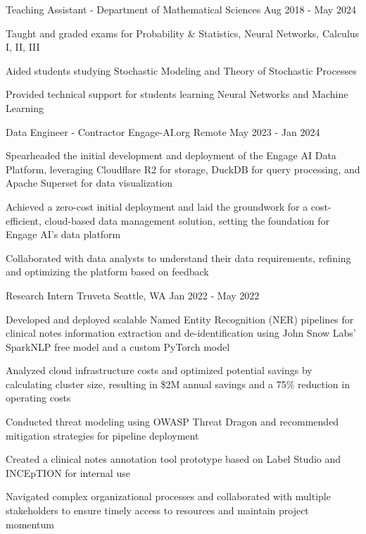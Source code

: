 \begin{cventries}
	\cventry
	{Teaching Assistant - Department of Mathematical Sciences}
	{}
	{}
	{Aug 2018 - May 2024}
	{\begin{cvitems}
			\item {Taught and graded exams for Probability \& Statistics, Neural Networks, Calculus I, II, III}
			\item {Aided students studying Stochastic Modeling and Theory of Stochastic Processes}
			\item {Provided technical support for students learning Neural Networks and Machine Learning}
		\end{cvitems}}
	
	
	\cventry
	{Data Engineer - Contractor}
	{Engage-AI.org}
	{Remote}
	{May 2023 - Jan 2024}
	{\begin{cvitems}
			\item {Spearheaded the initial development and deployment of the Engage AI Data Platform, leveraging Cloudflare R2 for storage, DuckDB for query processing, and Apache Superset for data visualization}
			\item {Achieved a zero-cost initial deployment and laid the groundwork for a cost-efficient, cloud-based data management solution, setting the foundation for Engage AI's data platform}
			\item {Collaborated with data analysts to understand their data requirements, refining and optimizing the platform based on feedback}
		\end{cvitems}}


	\cventry
	{Research Intern}
	{Truveta}
	{Seattle, WA}
	{Jan 2022 - May 2022}
	{\begin{cvitems}
			\item {Developed and deployed scalable Named Entity Recognition (NER) pipelines for clinical notes information extraction and de-identification using John Snow Labs' SparkNLP free model and a custom PyTorch model}
			\item {Analyzed cloud infrastructure costs and optimized potential savings by calculating cluster size, resulting in \$2M annual savings and a 75\% reduction in operating costs}
			\item {Conducted threat modeling using OWASP Threat Dragon and recommended mitigation strategies for pipeline deployment}
			\item {Created a clinical notes annotation tool prototype based on Label Studio and INCEpTION for internal use}
			\item {Navigated complex organizational processes and collaborated with multiple stakeholders to ensure timely access to resources and maintain project momentum}
		\end{cvitems}}


\end{cventries}
